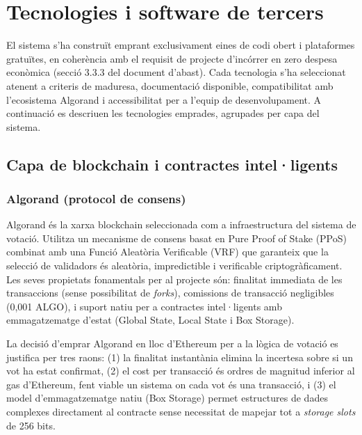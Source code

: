 \section{Tecnologies i software de tercers}
 
El sistema s'ha construït emprant exclusivament eines de codi obert i plataformes gratuïtes, en coherència amb el requisit de projecte d'incórrer en zero despesa econòmica (secció 3.3.3 del document d'abast). Cada tecnologia s'ha seleccionat atenent a criteris de maduresa, documentació disponible, compatibilitat amb l'ecosistema Algorand i accessibilitat per a l'equip de desenvolupament. A continuació es descriuen les tecnologies emprades, agrupades per capa del sistema.
 
\subsection{Capa de blockchain i contractes intel·ligents}
 
\subsubsection{Algorand (protocol de consens)}
 
Algorand és la xarxa blockchain seleccionada com a infraestructura del sistema de votació. Utilitza un mecanisme de consens basat en Pure Proof of Stake (PPoS) combinat amb una Funció Aleatòria Verificable (VRF) que garanteix que la selecció de validadors és aleatòria, impredictible i verificable criptogràficament. Les seves propietats fonamentals per al projecte són: finalitat immediata de les transaccions (sense possibilitat de \textit{forks}), comissions de transacció negligibles (0,001 ALGO), i suport natiu per a contractes intel·ligents amb emmagatzematge d'estat (Global State, Local State i Box Storage).
 
La decisió d'emprar Algorand en lloc d'Ethereum per a la lògica de votació es justifica per tres raons: (1) la finalitat instantània elimina la incertesa sobre si un vot ha estat confirmat, (2) el cost per transacció és ordres de magnitud inferior al gas d'Ethereum, fent viable un sistema on cada vot és una transacció, i (3) el model d'emmagatzematge natiu (Box Storage) permet estructures de dades complexes directament al contracte sense necessitat de mapejar tot a \textit{storage slots} de 256 bits.
 
